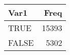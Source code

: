 \begin{table}[H]
\centering
\begin{tabular}[t]{lr}
\toprule
Var1 & Freq\\
\midrule
TRUE & 15393\\
FALSE & 5302\\
\bottomrule
\end{tabular}
\end{table}